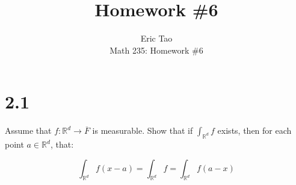 \documentclass[10pt]{article}
\newenvironment{problem}[2][Problem]{\begin{trivlist}
\item[\hskip \labelsep {\bfseries #1}\hskip \labelsep {\bfseries #2.}]}{\end{trivlist}}
\begin{document}
 
\title{Homework \#6}
\author{Eric Tao\\
Math 235: Homework \#6}
\maketitle
 
\section*{2.1}

\begin{problem}{4.3.9}
Assume that $f: \mathbb{R}^d \to \overline{F}$ is measurable. Show that if $\int_{\mathbb{R}^d} f$ exists, then for each point $a \in \mathbb{R}^d$, that:

$$ \int_{\mathbb{R}^d} f(x-a) = \int_{\mathbb{R}^d} f = \int_{\mathbb{R}^d} f(a-x)$$
\end{problem}
\end{document}
